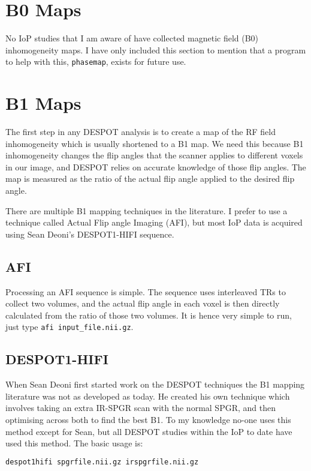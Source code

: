 \documentclass{report}
\begin{document}
\section{B0 Maps}

No IoP studies that I am aware of have collected magnetic field (B0) inhomogeneity maps. I have only included this section to mention that a program to help with this, \texttt{phasemap}, exists for future use.

\section{B1 Maps}

The first step in any DESPOT analysis is to create a map of the RF field inhomogeneity which is usually shortened to a B1 map. We need this because B1 inhomogeneity changes the flip angles that the scanner applies to different voxels in our image, and DESPOT relies on accurate knowledge of those flip angles. The map is measured as the ratio of the actual flip angle applied to the desired flip angle.

There are multiple B1 mapping techniques in the literature. I prefer to use a technique called Actual Flip angle Imaging (AFI), but most IoP data is acquired using Sean Deoni's DESPOT1-HIFI sequence.

\subsection{AFI}

Processing an AFI sequence is simple. The sequence uses interleaved TRs to collect two volumes, and the actual flip angle in each voxel is then directly calculated from the ratio of those two volumes. It is hence very simple to run, just type \texttt{afi input\_file.nii.gz}.

\subsection{DESPOT1-HIFI}

When Sean Deoni first started work on the DESPOT techniques the B1 mapping literature was not as developed as today. He created his own technique which involves taking an extra IR-SPGR scan with the normal SPGR, and then optimising across both to find the best B1. To my knowledge no-one uses this method except for Sean, but all DESPOT studies within the IoP to date have used this method. The basic usage is:

\begin{lstlisting}[language=sh]
despot1hifi spgrfile.nii.gz irspgrfile.nii.gz
\end{lstlisting}
\end{document}

